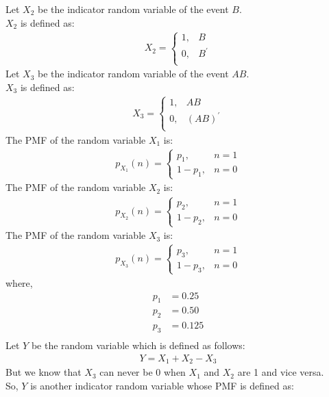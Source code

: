 \documentclass[journal]{IEEEtran}
\begin{document}
Let \(X_2\) be the indicator random variable of the event \(B\).\\
\(X_2\) is defined as:
\begin{align}
	X_2 =
	\begin{cases}
		1 ,& B\\
		0 ,& B^\prime\\
	\end{cases}
\end{align}
Let \(X_3\) be the indicator random variable of the event \(AB\).\\
\(X_3\) is defined as:
\begin{align}
	X_3 =
	\begin{cases}
		1 ,& AB\\
		0 ,& (AB)^\prime\\
	\end{cases}
\end{align}
The PMF of the random variable \(X_1\) is:
\begin{align}
	p_{X_1}(n) =
	\begin{cases}
		p_1 ,& n = 1\\
		1 - p_1 ,& n = 0
	\end{cases}
\end{align}
The PMF of the random variable \(X_2\) is:
\begin{align}
	p_{X_2}(n) =
	\begin{cases}
		p_2 ,& n = 1\\
		1 - p_2 ,& n = 0
	\end{cases}
\end{align}
The PMF of the random variable \(X_3\) is:
\begin{align}
	p_{X_3}(n) =
	\begin{cases}
		p_3 ,& n = 1\\
		1 - p_3 ,& n = 0
	\end{cases}
\end{align}
where,
\begin{align}
	p_1 &= 0.25\\
	p_2 &= 0.50\\
	p_3 &= 0.125\\
\end{align}
Let \(Y\) be the random variable which is defined as follows:
\begin{align}
	Y = X_1 + X_2 - X_3
\end{align}
But we know that \(X_3\) can never be 0 when \(X_1\) and \(X_2\) are 1 and vice versa.\\
So, \(Y\) is another indicator random variable whose PMF is defined as:
\end{document}
